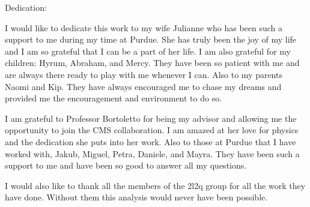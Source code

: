 %
%
%
%
%

\begin{dedication}
Dedication:

I would like to dedicate this work to my wife Julianne who has been such a support to me during my time at Purdue.  She has truly been the joy of my life and I am so grateful that I can be a part of her life.  I am also grateful for my children: Hyrum, Abraham, and Mercy.  They have been so patient with me and are always there ready to play with me whenever I can. Also to my parents Naomi and Kip.  They have always encouraged me to chase my dreams and provided me the encouragement and environment to do so.

I am grateful to Professor Bortoletto for being my advisor and allowing me the opportunity to join the CMS collaboration.  I am amazed at her love for physics and the dedication she puts into her work.  Also to those at Purdue that I have worked with, Jakub, Miguel, Petra, Daniele, and Mayra.  They have been such a support to me and have been so good to answer all my questions.

I would also like to thank all the members of the 2l2q group for all the work they have done.  Without them this analysis would never have been possible.


\end{dedication}




